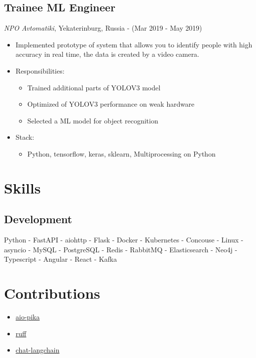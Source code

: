 \documentclass{article}
\begin{document}
\subsection*{Trainee ML Engineer}
\textit{NPO Avtomatiki}, Yekaterinburg, Russia - (Mar 2019 - May 2019)
\begin{itemize}
    \item Implemented prototype of system that allows you to identify people with high accuracy in real time, the data is created by a video camera.
    \item Responsibilities:
    \begin{itemize}
        \item Trained additional parts of YOLOV3 model
        \item Optimized of YOLOV3 performance on weak hardware
        \item Selected a ML model for object recognition
    \end{itemize}
    \item Stack:
    \begin{itemize}
        \item Python, tensorflow, keras, sklearn, Multiprocessing on Python
    \end{itemize}
\end{itemize}

\section*{Skills}
\subsection*{Development}
Python - FastAPI - aiohttp - Flask - Docker - Kubernetes - Concouse - Linux - asyncio - MySQL - PostgreSQL - Redis - RabbitMQ - Elasticsearch - Neo4j - Typescript - Angular - React - Kafka

\section*{Contributions}
\begin{itemize}
    \item \href{https://github.com/mosquito/aio-pika}{aio-pika}
    \item \href{https://github.com/astral-sh/ruff}{ruff}
    \item \href{https://github.com/langchain-ai/chat-langchain}{chat-langchain}
\end{itemize}
\end{document}
